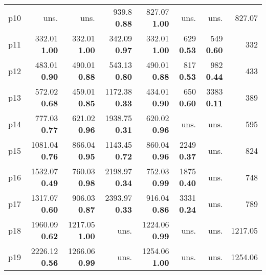 \begin{tabular}{lrrrrrrr}
\multicolumn{1}{l|}{p10} & uns. & uns. & {\footnotesize 939.8} \textbf{0.88} & {\footnotesize 827.07} \textbf{1.00} & uns. & uns. & \multicolumn{1}{|r}{827.07}\\
\multicolumn{1}{l|}{p11} & {\footnotesize 332.01} \textbf{1.00} & {\footnotesize 332.01} \textbf{1.00} & {\footnotesize 342.09} \textbf{0.97} & {\footnotesize 332.01} \textbf{1.00} & {\footnotesize 629} \textbf{0.53} & {\footnotesize 549} \textbf{0.60} & \multicolumn{1}{|r}{332}\\
\multicolumn{1}{l|}{p12} & {\footnotesize 483.01} \textbf{0.90} & {\footnotesize 490.01} \textbf{0.88} & {\footnotesize 543.13} \textbf{0.80} & {\footnotesize 490.01} \textbf{0.88} & {\footnotesize 817} \textbf{0.53} & {\footnotesize 982} \textbf{0.44} & \multicolumn{1}{|r}{433}\\
\multicolumn{1}{l|}{p13} & {\footnotesize 572.02} \textbf{0.68} & {\footnotesize 459.01} \textbf{0.85} & {\footnotesize 1172.38} \textbf{0.33} & {\footnotesize 434.01} \textbf{0.90} & {\footnotesize 650} \textbf{0.60} & {\footnotesize 3383} \textbf{0.11} & \multicolumn{1}{|r}{389}\\
\multicolumn{1}{l|}{p14} & {\footnotesize 777.03} \textbf{0.77} & {\footnotesize 621.02} \textbf{0.96} & {\footnotesize 1938.75} \textbf{0.31} & {\footnotesize 620.02} \textbf{0.96} & uns. & uns. & \multicolumn{1}{|r}{595}\\
\multicolumn{1}{l|}{p15} & {\footnotesize 1081.04} \textbf{0.76} & {\footnotesize 866.04} \textbf{0.95} & {\footnotesize 1143.45} \textbf{0.72} & {\footnotesize 860.04} \textbf{0.96} & {\footnotesize 2249} \textbf{0.37} & uns. & \multicolumn{1}{|r}{824}\\
\multicolumn{1}{l|}{p16} & {\footnotesize 1532.07} \textbf{0.49} & {\footnotesize 760.03} \textbf{0.98} & {\footnotesize 2198.97} \textbf{0.34} & {\footnotesize 752.03} \textbf{0.99} & {\footnotesize 1875} \textbf{0.40} & uns. & \multicolumn{1}{|r}{748}\\
\multicolumn{1}{l|}{p17} & {\footnotesize 1317.07} \textbf{0.60} & {\footnotesize 906.03} \textbf{0.87} & {\footnotesize 2393.97} \textbf{0.33} & {\footnotesize 916.04} \textbf{0.86} & {\footnotesize 3331} \textbf{0.24} & uns. & \multicolumn{1}{|r}{789}\\
\multicolumn{1}{l|}{p18} & {\footnotesize 1960.09} \textbf{0.62} & {\footnotesize 1217.05} \textbf{1.00} & uns. & {\footnotesize 1224.06} \textbf{0.99} & uns. & uns. & \multicolumn{1}{|r}{1217.05}\\
\multicolumn{1}{l|}{p19} & {\footnotesize 2226.12} \textbf{0.56} & {\footnotesize 1266.06} \textbf{0.99} & uns. & {\footnotesize 1254.06} \textbf{1.00} & uns. & uns. & \multicolumn{1}{|r}{1254.06}\\

\end{tabular}
